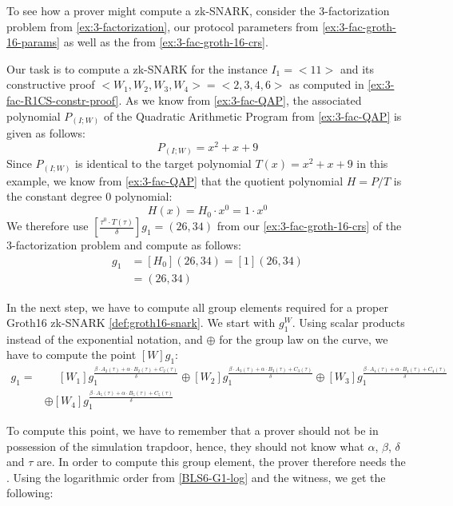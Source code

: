 \begin{example}\label{3-fac-snark-compute} To see how a prover might compute 
a zk-SNARK, consider the $3$-factorization problem from \examplename{} \ref{ex:3-factorization}, our protocol parameters from \examplename{} \ref{ex:3-fac-groth-16-params} as well as the  from \eqref{ex:3-fac-groth-16-crs}.

Our task is to compute a zk-SNARK for the instance $I_1=<11>$ and its constructive proof $<W_1,W_2,W_3,W_4>=<2,3,4,6>$ as computed in \examplename{} \ref{ex:3-fac-R1CS-constr-proof}. As we know from \examplename{} \ref{ex:3-fac-QAP}, the associated polynomial $P_{(I;W)}$ of the Quadratic Arithmetic Program from \examplename{} \ref{ex:3-fac-QAP} is given as follows:
$$
P_{(I;W)} = x^2 + x + 9
$$ 
Since $P_{(I;W)}$ is identical to the target polynomial $T(x)=x^2+x + 9$ in this example, we know from \examplename{} \ref{ex:3-fac-QAP} that the quotient polynomial $H=P/T$ is the constant degree $0$ polynomial:
$$
H(x)= H_0 \cdot x^0 = 1 \cdot x^0
$$
We therefore use $[\frac{\tau^0\cdot T(\tau)}{\delta}]g_1=(26,34)$ from our  \eqref{ex:3-fac-groth-16-crs} of the $3$-factorization problem and compute as follows:
\begin{align*}
[\frac{H(\tau)\cdot T(\tau)}{\delta}]g_1 &= [H_0](26,34)=[1](26,34)\\
                                   &= (26,34)
\end{align*}

In the next step, we have to compute all group elements required for a proper Groth16 zk-SNARK \eqref{def:groth16-snark}. We start with $g_1^W$. Using scalar products instead of the exponential notation, and $\oplus$ for the group law on the  curve, we have to compute the point $[W]g_1$:
\begin{align*}
[W]g_1 = & \phantom{\oplus} [W_1] g_1^{\frac{\beta\cdot A_{2}(\tau)+\alpha\cdot B_{2}(\tau)+C_{2}(\tau)}{\delta}}
        \oplus [W_2] g_1^{\frac{\beta\cdot A_{3}(\tau)+\alpha\cdot B_{3}(\tau)+C_{3}(\tau)}{\delta}}        
         \oplus [W_3] g_1^{\frac{\beta\cdot A_{4}(\tau)+\alpha\cdot B_{4}(\tau)+C_{4}(\tau)}{\delta}}\\        
         &\oplus [W_4] g_1^{\frac{\beta\cdot A_{5}(\tau)+\alpha\cdot B_{5}(\tau)+C_{5}(\tau)}{\delta}}
\end{align*}

To compute this point, we have to remember that a prover should not be in possession of the simulation trapdoor, hence, they should not know what $\alpha$, $\beta$, $\delta$ and $\tau$ are. In order to compute this group element, the prover therefore needs the . Using the logarithmic order from \ref{BLS6-G1-log} and the witness, we get the following:


\end{example}

